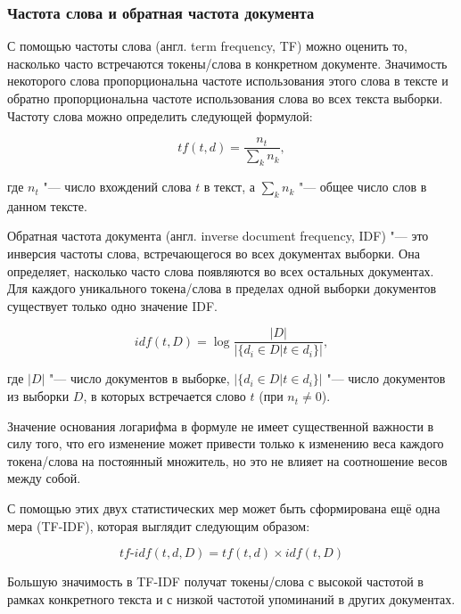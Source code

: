 \documentclass[bachelor, och, coursework]{SCWorks}
\begin{document}
        \subsubsection{Частота слова и обратная частота документа}

            С помощью частоты слова (англ. term frequency, TF) можно оценить то,
            насколько часто встречаются токены/слова в конкретном документе.
            Значимость некоторого слова пропорциональна частоте использования
            этого слова в тексте и обратно пропорциональна частоте использования
            слова во всех текста выборки. Частоту слова можно определить
            следующей формулой:

            $$tf(t, d) = \frac{n_t}{\sum_k n_k},$$

            где $n_t$ "--- число вхождений слова $t$ в текст, а $\sum_k n_k$
            "--- общее число слов в данном тексте.

            Обратная частота документа (англ. inverse document frequency, IDF)
            "--- это инверсия частоты слова, встречающегося во всех документах
            выборки. Она определяет, насколько часто слова появляются во всех
            остальных документах. Для каждого уникального токена/слова в
            пределах одной выборки документов существует только одно значение
            IDF.

            $$idf(t, D) = \log \frac{|D|}{|\{d_i \in D | t \in d_i \}|},$$

            где $|D|$ "--- число документов в выборке, $|\{d_i \in D | t \in d_i
            \}|$ "--- число документов из выборки $D$, в которых встречается
            слово $t$ (при $n_t \neq 0$).

            Значение основания логарифма в формуле не имеет существенной
            важности в силу того, что его изменение может привести только к
            изменению веса каждого токена/слова на постоянный множитель, но это
            не влияет на соотношение весов между собой.

            С помощью этих двух статистических мер может быть сформирована ещё
            одна мера (TF-IDF), которая выглядит следующим образом:

            $$tf \text{-} idf(t, d, D) = tf(t,d) \times idf(t, D)$$

            Большую значимость в TF-IDF получат токены/слова с высокой частотой
            в рамках конкретного текста и с низкой частотой упоминаний в других
            документах.
\end{document}

